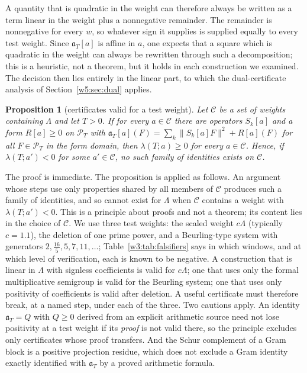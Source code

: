 \documentclass[11pt]{amsart}
\newtheorem{proposition}[theorem]{Proposition}
\theoremstyle{definition}
\theoremstyle{remark}
\numberwithin{equation}{section}
\newcommand{\PT}{\mathcal{P}_T}                        %
\newcommand{\aT}{\mathfrak{a}_T}                       %
\begin{document}
A quantity that is quadratic in the weight can therefore always be written as a term linear in the weight plus a
nonnegative remainder. The remainder is nonnegative for every $w$, so whatever sign it supplies is supplied equally to
every test weight. Since $\aT[a]$ is affine in $a$, one expects that a square which is quadratic in the weight can always
be rewritten through such a decomposition; this is a heuristic, not a theorem, but it holds in each construction we
examined. The decision then lies entirely in the linear part, to which the dual-certificate analysis of
Section~\ref{w5:sec:dual} applies.

\begin{proposition}[certificates valid for a test weight]\label{w4:prop:controls}
Let $\mathcal C$ be a set of weights containing $\Lambda$ and let $T>0$. If for every $a\in\mathcal C$ there are operators $S_k[a]$ and a form
$R[a]\ge0$ on $\PT$ with $\aT[a](F)=\sum_k\|S_k[a]F\|^2+R[a](F)$ for all $F\in\PT$ in the form domain, then $\lambda(T;a)\ge0$ for
every $a\in\mathcal C$. Hence, if $\lambda(T;a')<0$ for some $a'\in\mathcal C$, no such family of identities exists on $\mathcal C$.
\end{proposition}

The proof is immediate. The proposition is applied as follows. An argument whose steps use only properties shared by all
members of $\mathcal C$ produces such a family of identities, and so cannot exist for $\Lambda$ when $\mathcal C$ contains
a weight with $\lambda(T;a')<0$. This is a principle about proofs and not a theorem; its content lies in the choice of
$\mathcal C$. We use three test weights: the scaled weight $c\Lambda$ (typically $c=1.1$), the deletion of one prime
power, and a Beurling-type system with generators $2,\frac{16}5,5,7,11,\dots$; Table~\ref{w3:tab:falsifiers} says in
which windows, and at which level of verification, each is known to be negative. A construction that is linear in
$\Lambda$ with signless coefficients is valid for $c\Lambda$; one that uses only the formal multiplicative semigroup is
valid for the Beurling system; one that uses only positivity of coefficients is valid after deletion. A useful
certificate must therefore break, at a named step, under each of the three. Two cautions apply. An identity $\aT=Q$ with
$Q\ge0$ derived from an explicit arithmetic source need not lose positivity at a test weight if its \emph{proof} is not
valid there, so the principle excludes only certificates whose proof transfers. And the Schur complement of a Gram block
is a positive projection residue, which does not exclude a Gram identity exactly identified with $\aT$ by a proved
arithmetic formula.
\end{document}
